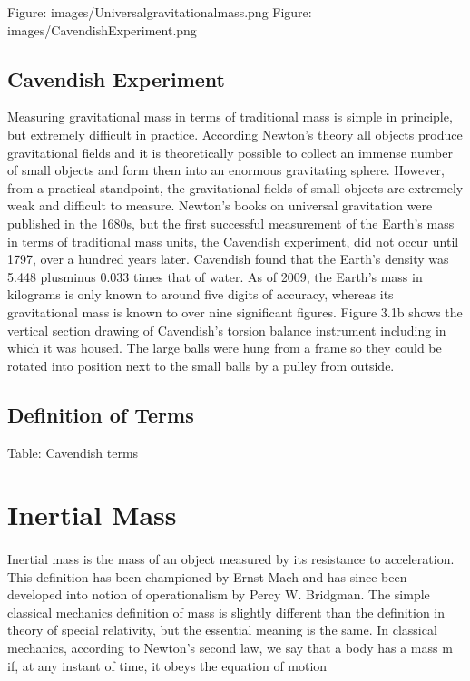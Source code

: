 \documentclass{book}
\begin{document}
Figure: images/Universalgravitationalmass.png Figure: images/CavendishExperiment.png

\subsection{Cavendish Experiment}

Measuring gravitational mass in terms of traditional mass is simple in principle, but extremely difficult in practice. According Newton's theory all objects produce gravitational fields and it is theoretically possible to collect an immense number of small objects and form them into an enormous gravitating sphere. However, from a practical standpoint, the gravitational fields of small objects are extremely weak and difficult to measure. Newton's books on universal gravitation were published in the 1680s, but the first successful measurement of the Earth's mass in terms of traditional mass units, the Cavendish experiment, did not occur until 1797, over a hundred years later. Cavendish found that the Earth's density was 5.448 plusminus 0.033 times that of water. As of 2009, the Earth's mass in kilograms is only known to around five digits of accuracy, whereas its gravitational mass is known to over nine significant figures. Figure 3.1b shows the vertical section drawing of Cavendish's torsion balance instrument including in which it was housed. The large balls were hung from a frame so they could be rotated into position next to the small balls by a pulley from outside.

\subsection{Definition of Terms}
Table: Cavendish terms

\section{Inertial Mass}
\paragraph{}
Inertial mass is the mass of an object measured by its resistance to acceleration. This definition has been championed by Ernst Mach and has since been developed into notion of operationalism by Percy W. Bridgman. The simple classical mechanics definition of mass is slightly different than the definition in theory of special relativity, but the essential meaning is the same. In classical mechanics, according to Newton's second law, we say that a body has a mass m if, at any instant of time, it obeys the equation of motion
\end{document}
